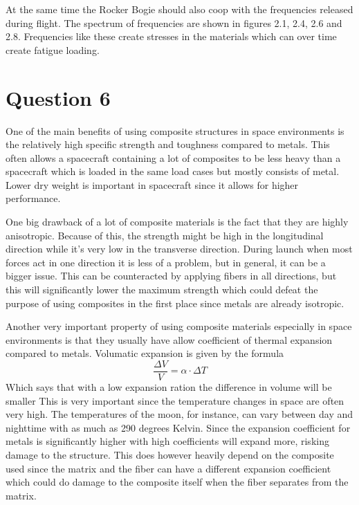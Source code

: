 At the same time the Rocker Bogie should also coop with the frequencies released during flight. The spectrum of frequencies are shown in figures 2.1, 2.4, 2.6 and 2.8. Frequencies like these create stresses in the materials which can over time create fatigue loading.



\section{Question 6}

One of the main benefits of using composite structures in space environments is the relatively high specific strength and toughness compared to metals. This often allows a spacecraft containing a lot of composites to be less heavy than a spacecraft which is loaded in the same load cases but mostly consists of metal. Lower dry weight is important in spacecraft since it allows for higher performance. 

One big drawback of a lot of composite materials is the fact that they are highly anisotropic. Because of this, the strength might be high in the longitudinal direction while it’s very low in the transverse direction. During launch when most forces act in one direction it is less of a problem, but in general, it can be a bigger issue. This can be counteracted by applying fibers in all directions, but this will significantly lower the maximum strength which could defeat the purpose of using composites in the first place since metals are already isotropic. 

Another very important property of using composite materials especially in space environments is that they usually have allow coefficient of thermal expansion compared to metals. Volumatic expansion is given by the formula
\begin{equation}
    \frac{\Delta V}{V} = \alpha \cdot \Delta T
\end{equation}
Which says that with a low expansion ration the difference in volume will be smaller
This is very important since the temperature changes in space are often very high. The temperatures of the moon, for instance, can vary between day and nighttime with as much as 290 degrees Kelvin. Since the expansion coefficient for metals is significantly higher with high coefficients will expand more, risking damage to the structure. This does however heavily depend on the composite used since the matrix and the fiber can have a different expansion coefficient which could do damage to the composite itself when the fiber separates from the matrix. 

